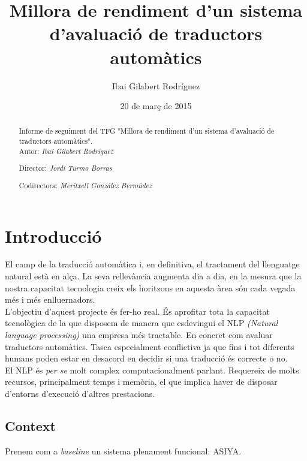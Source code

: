 \documentclass[11pt,a4paper]{article}
\begin{document}
\title{Millora de rendiment d'un sistema d'avaluació de traductors automàtics}
\author{Ibai Gilabert Rodríguez}
\date{20 de març de 2015}
\maketitle
\newpage

\begin{abstract}
Informe de seguiment del TFG "Millora de rendiment d'un sistema d'avaluació de traductors automàtics".
\\

Autor: \textit{Ibai Gilabert Rodríguez}

Director: \textit{Jordi Turmo Borras}

Codirectora: \textit{Meritxell González Bermúdez}
\end{abstract}
\newpage

\tableofcontents
\newpage

\section{Introducció}

El camp de la traducció automàtica i, en definitiva, el tractament del llenguatge natural està en alça. La seva rellevància augmenta dia a dia, en la mesura que la nostra capacitat tecnologia creix els horitzons en aquesta àrea són cada vegada més i més enlluernadors.
\\

L'objectiu d'aquest projecte és fer-ho real. És aprofitar tota la capacitat tecnològica de la que disposem de manera que esdevingui el NLP \textit{(Natural language processing)} una empresa més tractable. En concret com avaluar traductors automàtics. Tasca especialment conflictiva ja que fins i tot diferents humans poden estar en desacord en decidir si una traducció és correcte o no.
\\

El NLP és \textit{per se} molt complex computacionalment parlant. Requereix de molts recursos, principalment temps i memòria, el que implica haver de disposar d'entorns d'execució d'altres prestacions.
\\

\subsection{Context}
Prenem com a \textit{baseline} un sistema plenament funcional: ASIYA\cite{asiya}.
\\
\end{document}
